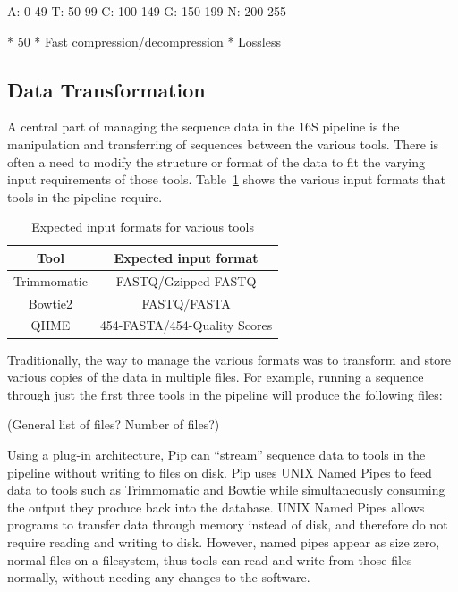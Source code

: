 \documentclass[12pt]{article}
\begin{document}
	A: 0-49
	T: 50-99
	C: 100-149
	G: 150-199
	N: 200-255

	* 50%
	* Fast compression/decompression
	* Lossless
	
	\subsection{Data Transformation} %
	\label{sec:data_transformation}
	A central part of managing the sequence data in the 16S pipeline is the manipulation
	and transferring of sequences between the various tools. There is often a need
	to modify the structure or format of the data to fit the varying input requirements
	of those tools. Table~\ref{tab:expected_input} shows the various input formats that
	tools in the pipeline require.

	\begin{table}
		\centering
		\begin{tabular}{c|c}
		\hline
		Tool & Expected input format\\
		\hline
		Trimmomatic & FASTQ/Gzipped FASTQ\\
		\hline
		Bowtie2 & FASTQ/FASTA\\
		\hline
		QIIME & 454-FASTA/454-Quality Scores\\
		\hline
		\end{tabular}
		\caption{Expected input formats for various tools}
		\label{tab:expected_input}
	\end{table}

	Traditionally, the way to manage the various formats was to transform and store
	various copies of the data in multiple files. For example, running a sequence through
	just the first three tools in the pipeline will produce the following files:

	(General list of files? Number of files?)
	
	Using a plug-in architecture, Pip can ``stream'' sequence data to tools in the
	pipeline without writing to files on disk. Pip uses UNIX Named Pipes to 
	feed data to tools such as Trimmomatic and Bowtie while simultaneously consuming the output
	they produce back into the database. UNIX Named Pipes allows programs to transfer
	data through memory instead of disk, and therefore do not require reading and
	writing to disk. However, named pipes appear as size zero, normal files on a filesystem,
	thus tools can read and write from those files normally, without needing any changes
	to the software.
	
\end{document}
